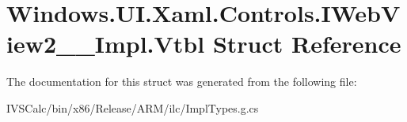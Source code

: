 \hypertarget{struct_windows_1_1_u_i_1_1_xaml_1_1_controls_1_1_i_web_view2_____impl_1_1_vtbl}{}\section{Windows.\+U\+I.\+Xaml.\+Controls.\+I\+Web\+View2\+\_\+\+\_\+\+Impl.\+Vtbl Struct Reference}
\label{struct_windows_1_1_u_i_1_1_xaml_1_1_controls_1_1_i_web_view2_____impl_1_1_vtbl}


The documentation for this struct was generated from the following file\+:\begin{DoxyCompactItemize}
\item 
I\+V\+S\+Calc/bin/x86/\+Release/\+A\+R\+M/ilc/Impl\+Types.\+g.\+cs\end{DoxyCompactItemize}
